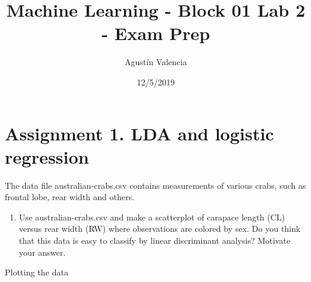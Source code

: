 \documentclass[
]{article}
\title{Machine Learning - Block 01 Lab 2 - Exam Prep}
\author{Agustín Valencia}
\date{12/5/2019}
\newenvironment{Shaded}{\begin{snugshade}}{\end{snugshade}}
\newcommand{\DataTypeTok}[1]{\textcolor[rgb]{0.13,0.29,0.53}{#1}}
\newcommand{\KeywordTok}[1]{\textcolor[rgb]{0.13,0.29,0.53}{\textbf{#1}}}
\newcommand{\NormalTok}[1]{#1}
\newcommand{\OperatorTok}[1]{\textcolor[rgb]{0.81,0.36,0.00}{\textbf{#1}}}
\newcommand{\StringTok}[1]{\textcolor[rgb]{0.31,0.60,0.02}{#1}}
\providecommand{\tightlist}{%
  \setlength{\itemsep}{0pt}\setlength{\parskip}{0pt}}
\begin{document}
\maketitle

\hypertarget{assignment-1.-lda-and-logistic-regression}{%
\section{Assignment 1. LDA and logistic
regression}\label{assignment-1.-lda-and-logistic-regression}}

The data file australian-crabs.csv contains measurements of various
crabs, such as frontal lobe, rear width and others.

\begin{enumerate}
\def\labelenumi{\arabic{enumi}.}
\tightlist
\item
  Use australian-crabs.csv and make a scatterplot of carapace length
  (CL) versus rear width (RW) where observations are colored by sex. Do
  you think that this data is easy to classify by linear discriminant
  analysis? Motivate your answer.
\end{enumerate}

Plotting the data

\begin{Shaded}
\end{Shaded}
\end{document}
